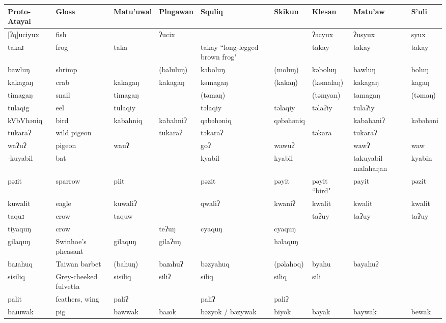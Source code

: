 
\begin{landscape}

\begin{longtable}{*{9}{p{}}}
Proto-Atayal & Gloss & Matu'uwal & Plngawan & Squliq & Skikun & Klesan & Matu'aw & S'uli\\\hline\endhead
\text{*}[ʔq]uciyux & fish &  & ʔucix &  &  & ʔəcyux & ʔusyux & syux\\
\text{*}takaɹ & frog & taka &  & takay ``long-legged brown frog" &  & takay & takay & takay\\
\text{*}bawluŋ & shrimp &  & (baluluŋ) & kəboluŋ & (moluŋ) & kəboluŋ & bawluŋ & boluŋ\\
\text{*}kakagaŋ & crab & kakagaŋ & kakagaŋ & kəmagaŋ & (kakaŋ) & (kəmalaŋ) & kakagaŋ & kagaŋ\\
\text{*}timagaŋ & snail & timagaŋ &  & (təmaŋ) &  & (təmyan) & tamagaŋ & (təmaŋ)\\
\text{*}tulaqig & eel & tulaqiy &  & təlaqiy & təlaqiy & təlaʔiy & tulaʔiy & \\
\text{*}kVbVhəniq & bird & kabahniq & kabahniʔ & qəbəhəniq & qəbəhəniq &  & kabahaniʔ & kəbəhəni\\
\text{*}tukaraʔ & wild pigeon &  & tukaraʔ & təkaraʔ &  & təkara & tukaraʔ & \\
\text{*}waʔuʔ & pigeon & wauʔ &  & goʔ & wawuʔ &  & wawʔ & waw\\
\text{*}-kuyabil & bat &  &  & kyabil & kyabil &  & takuyabil malahaŋan & kyabin\\
\text{*}pəɹit & sparrow & piit &  & pəzit & pəyit & pəyit ``bird" & payit & pəzit\\
\text{*}kuwalit & eagle & kuwaliʔ &  & qwaliʔ & kwaniʔ & kwalit & kwalit & kwalit\\
\text{*}taquɹ & crow & taquw &  &  &  & taʔuy & taʔuy & taʔuy\\
\text{*}tiyaquŋ & crow &  & teʔuŋ & cyaquŋ & cyaquŋ &  &  & \\
\text{*}gilaquŋ & Swinhoe's pheasant & gilaquŋ & gilaʔuŋ &  & həlaquŋ &  &  & \\
\text{*}baɹahuq & Taiwan barbet & (bahuŋ) & baɹahuʔ & bəzyahuq & (pəlahoq) & byahu & bayahuʔ & \\
\text{*}sisiliq & Grey-cheeked fulvetta & sisiliq & siliʔ & siliq & siliq & sili &  & \\
\text{*}palit & feathers, wing & paliʔ &  & paliʔ & paliʔ &  &  & \\
\text{*}baɹuwak & pig & bawwak & baɹok & bəzyok / bəzywak & biyok & bəyak & baywak & bewak\\

\end{longtable}
\end{landscape}
